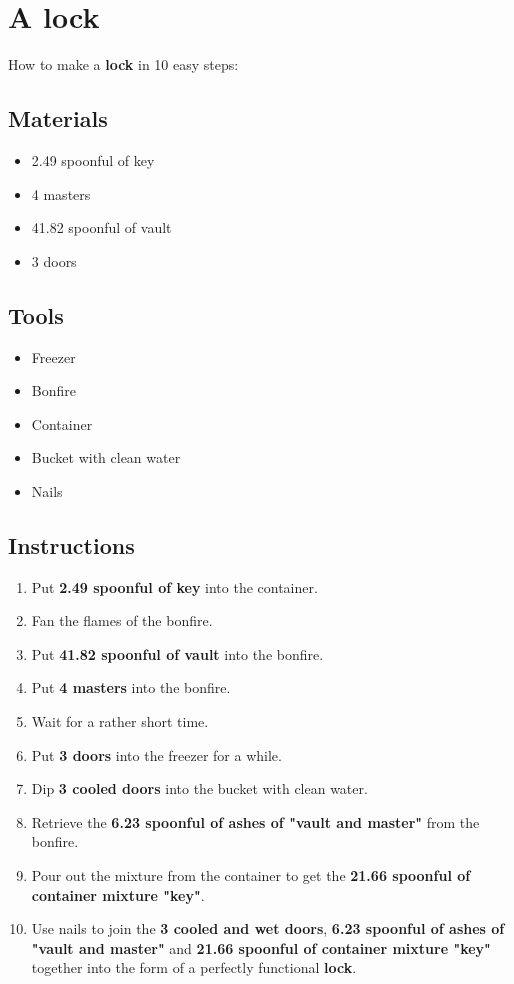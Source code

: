 \documentclass{article}
\begin{document}
\section{A lock}How to make a \textbf{lock} in 10 easy steps:

\subsection{Materials}\begin{itemize}
\item 
2.49 spoonful of key
\item 
4 masters
\item 
41.82 spoonful of vault
\item 
3 doors
\end{itemize}
\subsection{Tools}\begin{itemize}
\item 
Freezer
\item 
Bonfire
\item 
Container
\item 
Bucket with clean water
\item 
Nails
\end{itemize}
\subsection{Instructions}\begin{enumerate}
\item 
Put \textbf{2.49 spoonful of key} into the container.
\item 
Fan the flames of the bonfire.
\item 
Put \textbf{41.82 spoonful of vault} into the bonfire.
\item 
Put \textbf{4 masters} into the bonfire.
\item 
Wait for a rather short time.
\item 
Put \textbf{3 doors} into the freezer for a while.
\item 
Dip \textbf{3 cooled doors} into the bucket with clean water.
\item 
Retrieve the \textbf{6.23 spoonful of ashes of "vault and master"} from the bonfire.
\item 
Pour out the mixture from the container to get the \textbf{21.66 spoonful of container mixture "key"}.
\item 
Use nails to join the \textbf{3 cooled and wet doors}, \textbf{6.23 spoonful of ashes of "vault and master"} and \textbf{21.66 spoonful of container mixture "key"} together into the form of a perfectly functional \textbf{lock}.
\end{enumerate}
\newpage
\end{document}
